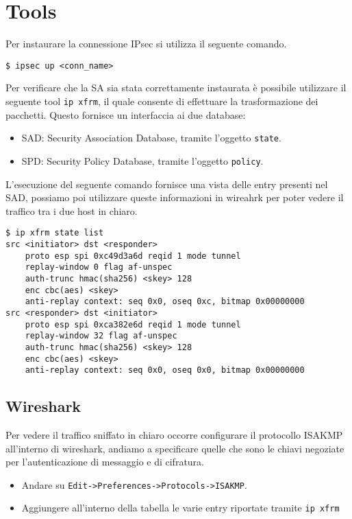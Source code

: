 \documentclass[
10pt, %
a4paper, %
oneside, %
headinclude,footinclude, %
BCOR5mm, %
]{scrartcl}
\begin{document}
\section{Tools}

Per instaurare la connessione IPsec si utilizza il seguente comando.
\vspace*{0.2cm}
\begin{lstlisting}
$ ipsec up <conn_name>
\end{lstlisting}
Per verificare che la SA sia stata correttamente instaurata è possibile utilizzare il seguente tool \lstinline|ip xfrm|,
il quale consente di effettuare la trasformazione dei pacchetti. Questo fornisce un interfaccia ai due database:
\begin{itemize}
    \item SAD: Security Association Database, tramite l'oggetto \lstinline|state|.
    \item SPD: Security Policy Database, tramite l'oggetto \lstinline|policy|.
\end{itemize}

\noindent
L'esecuzione del seguente comando fornisce una vista delle entry presenti nel SAD, possiamo poi utilizzare queste informazioni in wireahrk
per poter vedere il traffico tra i due host in chiaro.
\vspace*{0.2cm}
\begin{lstlisting}
$ ip xfrm state list
src <initiator> dst <responder>
    proto esp spi 0xc49d3a6d reqid 1 mode tunnel
    replay-window 0 flag af-unspec
    auth-trunc hmac(sha256) <skey> 128
    enc cbc(aes) <skey>
    anti-replay context: seq 0x0, oseq 0xc, bitmap 0x00000000
src <responder> dst <initiator>
    proto esp spi 0xca382e6d reqid 1 mode tunnel
    replay-window 32 flag af-unspec
    auth-trunc hmac(sha256) <skey> 128
    enc cbc(aes) <skey>
    anti-replay context: seq 0x0, oseq 0x0, bitmap 0x00000000
\end{lstlisting}

\subsection*{Wireshark}
Per vedere il traffico sniffato in chiaro occorre configurare il protocollo ISAKMP all'interno di wireshark, andiamo a specificare quelle che sono
le chiavi negoziate per l'autenticazione di messaggio e di cifratura.

\begin{itemize}
    \item Andare su \lstinline|Edit->Preferences->Protocols->ISAKMP|.
    \item Aggiungere all'interno della tabella le varie entry riportate tramite \lstinline|ip xfrm|
\end{itemize}
\end{document}
